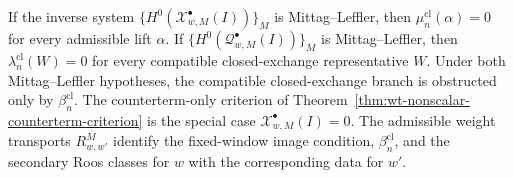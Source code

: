 \begin{thm}
  If the inverse system
  \(\{H^0(\mathcal X^\bullet_{w,M}(I))\}_M\) is Mittag--Leffler, then
  \(\mu^{\mathrm{cl}}_n(\alpha)=0\) for every admissible lift
  \(\alpha\).  If
  \(\{H^0(\mathcal Q^\bullet_{w,M}(I))\}_M\) is Mittag--Leffler, then
  \(\lambda^{\mathrm{cl}}_n(W)=0\) for every compatible closed-exchange
  representative \(W\).  Under both Mittag--Leffler hypotheses, the
  compatible closed-exchange branch is obstructed only by
  \(\beta^{\mathrm{cl}}_n\).  The counterterm-only criterion of
  Theorem~\ref{thm:wt-nonscalar-counterterm-criterion} is the special case
  \(\mathcal X^\bullet_{w,M}(I)=0\).
  The admissible weight transports \(R^M_{w,w'}\) identify the fixed-window
  image condition, \(\beta^{\mathrm{cl}}_n\), and the secondary Roos
  classes for \(w\) with the corresponding data for \(w'\).
\end{thm}

